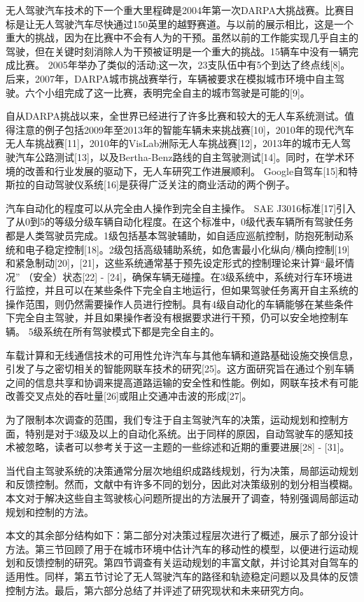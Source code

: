无人驾驶汽车技术的下一个重大里程碑是2004年第一次DARPA大挑战赛。比赛目标是让无人驾驶汽车尽快通过150英里的越野赛道。与以前的展示相比，这是一个重大的挑战，因为在比赛中不会有人为的干预。虽然以前的工作能实现几乎自主的驾驶，但在关键时刻消除人为干预被证明是一个重大的挑战。15辆车中没有一辆完成比赛。 2005年举办了类似的活动;这一次，23支队伍中有5个到达了终点线[8]。后来，2007年，DARPA城市挑战赛举行，车辆被要求在模拟城市环境中自主驾驶。六个小组完成了这一比赛，表明完全自主的城市驾驶是可能的[9]。

自从DARPA挑战以来，全世界已经进行了许多比赛和较大的无人车系统测试。值得注意的例子包括2009年至2013年的智能车辆未来挑战赛[10]，2010年的现代汽车无人车挑战赛[11]，2010年的VisLab洲际无人车挑战赛[12]，2013年的城市无人驾驶汽车公路测试[13]，以及Bertha-Benz路线的自主驾驶测试[14]。同时，在学术环境的改善和行业发展的驱动下，无人车研究工作进展顺利。 Google自驾车[15]和特斯拉的自动驾驶仪系统[16]是获得广泛关注的商业活动的两个例子。

汽车自动化的程度可以从完全由人操作到完全自主操作。 SAE J3016标准[17]引入了从0到5的等级分级车辆自动化程度。在这个标准中，0级代表车辆所有驾驶任务都是人类驾驶员完成。1级包括基本驾驶辅助，如自适应巡航控制，防抱死制动系统和电子稳定控制[18]。2级包括高级辅助系统，如危害最小化纵向/横向控制[19]和紧急制动[20]，[21]，这些系统通常基于预先设定形式的控制理论来计算“最坏情况” （安全）状态[22] - [24]，确保车辆无碰撞。在3级系统中，系统对行车环境进行监控，并且可以在某些条件下完全自主地运行，但如果驾驶任务离开自主系统的操作范围，则仍然需要操作人员进行控制。具有4级自动化的车辆能够在某些条件下完全自主驾驶，并且如果操作者没有根据要求进行干预，仍可以安全地控制车辆。 5级系统在所有驾驶模式下都是完全自主的。

车载计算和无线通信技术的可用性允许汽车与其他车辆和道路基础设施交换信息，引发了与之密切相关的智能网联车技术的研究[25]。这方面研究旨在通过个别车辆之间的信息共享和协调来提高道路运输的安全性和性能。例如，网联车技术有可能改善交叉点处的吞吐量[26]或阻止交通冲击波的形成[27]。

为了限制本次调查的范围，我们专注于自主驾驶汽车的决策，运动规划和控制方面，特别是对于3级及以上的自动化系统。出于同样的原因，自动驾驶车的感知技术被忽略，读者可以参考关于这一主题的一些综述和近期的重要进展[28] - [31]。

当代自主驾驶系统的决策通常分层次地组织成路线规划，行为决策，局部运动规划和反馈控制。然而，文献中有许多不同的划分，因此对决策级别的划分相当模糊。本文对于解决这些自主驾驶核心问题所提出的方法展开了调查，特别强调局部运动规划和控制的方法。

本文的其余部分结构如下：第二部分对决策过程层次进行了概述，展示了部分设计方法。第三节回顾了用于在城市环境中估计汽车的移动性的模型，以便进行运动规划和反馈控制的研究。第四节调查有关运动规划的丰富文献，并讨论其对自驾车的适用性。同样，第五节讨论了无人驾驶汽车的路径和轨迹稳定问题以及具体的反馈控制方法。最后，第六部分总结了并评述了研究现状和未来研究方向。



